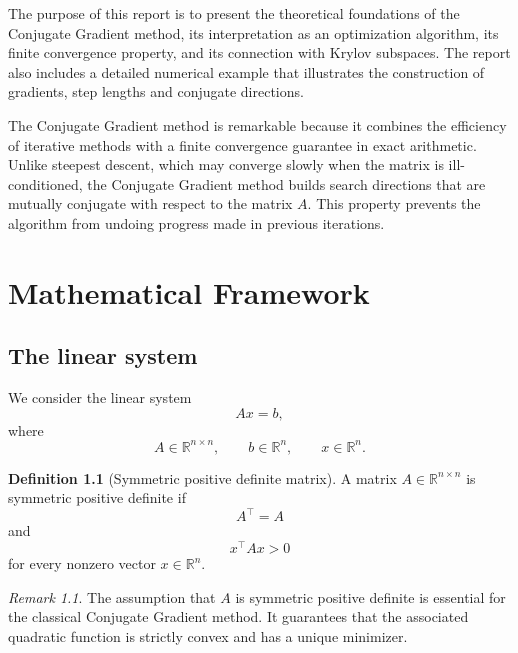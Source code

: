 \documentclass[11pt,a4paper]{report}
\theoremstyle{definition}
\newtheorem{definition}{Definition}[chapter]
\theoremstyle{plain}
\theoremstyle{remark}
\newtheorem{remark}{Remark}[chapter]
\begin{document}
The purpose of this report is to present the theoretical foundations of the Conjugate Gradient method, its interpretation as an optimization algorithm, its finite convergence property, and its connection with Krylov subspaces. The report also includes a detailed numerical example that illustrates the construction of gradients, step lengths and conjugate directions.

The Conjugate Gradient method is remarkable because it combines the efficiency of iterative methods with a finite convergence guarantee in exact arithmetic. Unlike steepest descent, which may converge slowly when the matrix is ill-conditioned, the Conjugate Gradient method builds search directions that are mutually conjugate with respect to the matrix $A$. This property prevents the algorithm from undoing progress made in previous iterations.

\newpage

\tableofcontents
\newpage

\chapter{Mathematical Framework}

\section{The linear system}

We consider the linear system
\[
A x = b,
\]
where
\[
A\in\mathbb{R}^{n\times n},\qquad b\in\mathbb{R}^n,\qquad x\in\mathbb{R}^n.
\]

\begin{definition}[Symmetric positive definite matrix]
A matrix $A\in\mathbb{R}^{n\times n}$ is symmetric positive definite if
\[
A^\top=A
\]
and
\[
x^\top A x>0
\]
for every nonzero vector $x\in\mathbb{R}^n$.
\end{definition}

\begin{remark}
The assumption that $A$ is symmetric positive definite is essential for the classical Conjugate Gradient method. It guarantees that the associated quadratic function is strictly convex and has a unique minimizer.
\end{remark}
\end{document}
